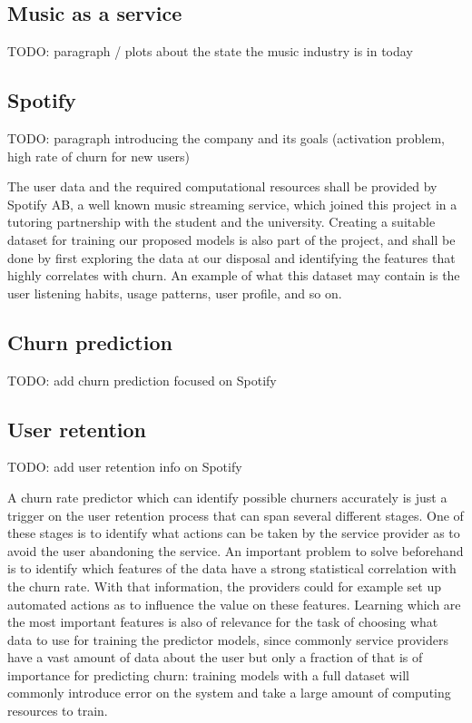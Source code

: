 \documentclass{kththesis}
\begin{document}
	\subsection{Music as a service}
	
	TODO: paragraph / plots about the state the music industry is in today    
        
    
	\subsection{Spotify}
	
	TODO: paragraph introducing the company and its goals (activation problem, high rate of churn for new users)   
    
    The user data and the required computational resources shall be provided by Spotify AB, a well known music streaming service, which joined this project in a tutoring partnership with the student and the university. Creating a suitable dataset for training our proposed models is also part of the project, and shall be done by first exploring the data at our disposal and identifying the features that highly correlates with churn. An example of what this dataset may contain is the user listening habits, usage patterns, user profile, and so on.    
    
	\subsection{Churn prediction}

	TODO: add churn prediction focused on Spotify
	
	\subsection{User retention} 

	TODO: add user retention info on Spotify	

    A churn rate predictor which can identify possible churners accurately is just a trigger on the user retention process that can span several different stages. One of these stages is to identify what actions can be taken by the service provider as to avoid the user abandoning the service. An important problem to solve beforehand is to identify which features of the data have a strong statistical correlation with the churn rate. With that information, the providers could for example set up automated actions as to influence the value on these features. Learning which are the most important features is also of relevance for the task of choosing what data to use for training the predictor models, since commonly service providers have a vast amount of data about the user but only a fraction of that is of importance for predicting churn: training models with a full dataset will commonly introduce error on the system and take a large amount of computing resources to train.
	
\end{document}
